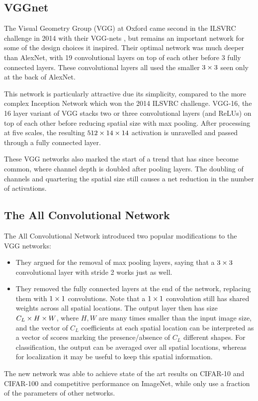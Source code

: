\subsection{VGGnet}
The Visual Geometry Group (VGG) at Oxford came second in the ILSVRC challenge in
2014 with their VGG-nets \cite{simonyan_very_2014}, but remains an important
network for some of the design choices it inspired. Their optimal
network was much deeper than AlexNet, with 19 convolutional layers on top of
each other before 3 fully connected layers. These convolutional layers all used
the smaller $3\times 3$ seen only at the back of AlexNet.

This network is particularly attractive due its simplicity, compared to the
more complex Inception Network \cite{szegedy_going_2015} which won the 2014
ILSVRC challenge. VGG-16, the 16 layer variant of VGG stacks two or three
convolutional layers (and ReLUs) on top of each other before reducing spatial
size with max pooling. After processing at five scales, the resulting $512 \times 14
\times 14$ activation is unravelled and passed through a fully connected layer.

These VGG networks also marked the start of a trend that has since become
common, where channel depth is doubled after pooling layers. The doubling of
channels and quartering the spatial size still causes a net reduction in the
number of activations.

\subsection{The All Convolutional Network}
The All Convolutional Network \cite{springenberg_striving_2014-3} introduced two
popular modifications to the VGG networks:
%
\begin{itemize}
  \item They argued for the removal of max pooling layers, saying that a $3\times 3$
    convolutional layer with stride 2 works just as well.
  \item They removed the fully connected layers at the end of the network,
    replacing them with $1\times 1$ convolutions. Note that a $1\times 1$ convolution
    still has shared weights across all spatial locations. The output layer then
    has size $C_L \times H \times W$, where $H, W$ are many times smaller than the input
    image size, and the vector of $C_L$ coefficients at each spatial location
    can be interpreted as a vector of scores marking the presence/absence of
    $C_L$ different shapes. For classification, the output can be averaged over
    all spatial locations, whereas for localization it may be useful to keep
    this spatial information.
\end{itemize}
The new network was able to achieve state of the art results on CIFAR-10 and
CIFAR-100 and competitive performance on ImageNet, while only use a fraction of
the parameters of other networks.

